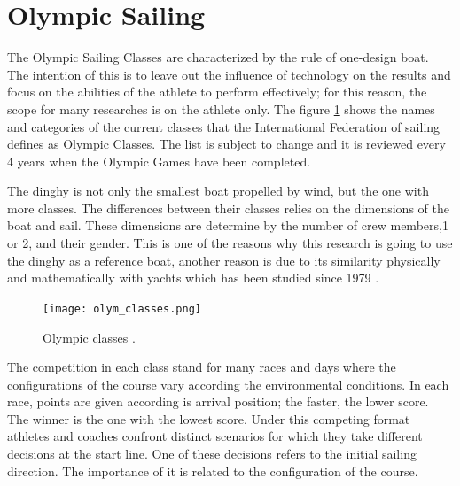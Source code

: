 \section {Olympic Sailing} \label{sec:olympic classes}
The Olympic Sailing Classes are characterized by the rule of one-design boat. The intention of this is to leave out the influence of technology on the results and focus on the abilities of the athlete to perform effectively; for this reason, the scope for many researches is on the athlete only. The figure \ref{fig:olymp_cla} shows the names and categories of the current classes that the International Federation of sailing defines as Olympic Classes. The list is subject to change and it is reviewed every 4 years when the Olympic Games have been completed.\par 
The dinghy is not only the smallest boat propelled by wind, but the one with more classes. The differences between their classes relies on the dimensions of the boat and sail. These dimensions are determine by the number of crew members,1 or 2, and their gender. This is one of the reasons why this research is going to use the dinghy as a reference boat, another reason is due to its similarity physically and mathematically with yachts which has been studied since 1979 \cite{marchajaereo1979}. \par 

\begin{figure}[ht]
\centering
 \texttt{[image: olym\_classes.png]}
  \caption{Olympic classes \cite{sailoly}.}
\label{fig:olymp_cla} 
\end{figure}

The competition in each class stand for many races and days where the configurations of the course vary according the environmental conditions. In each race, points are given according is arrival position; the faster, the lower score. The winner is the one with the lowest score. Under this competing format athletes and coaches confront distinct scenarios for which they take different decisions at the start line. One of these decisions refers to the initial sailing direction. The importance of it is related to the configuration of the course.\par 

